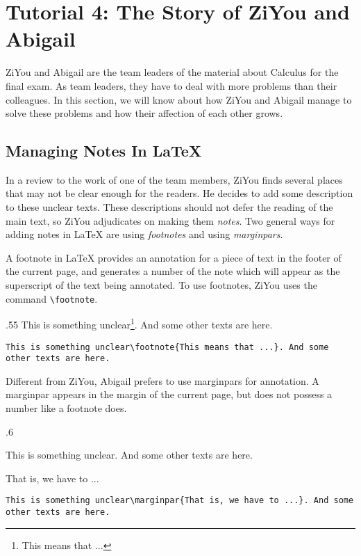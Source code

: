 \section{Tutorial 4: The Story of ZiYou and Abigail} %
ZiYou and Abigail are the team leaders of the material about Calculus for the final exam. As team leaders, they have to deal with more problems than their colleagues. In this section, we will know about how ZiYou and Abigail manage to solve these problems and how their affection of each other grows.

\subsection{Managing Notes In \LaTeX}
In a review to the work of one of the team members, ZiYou finds several places that may not be clear enough for the readers. He decides to add some description to these unclear texts. These descriptions should not defer the reading of the main text, so ZiYou adjudicates on making them \emph{notes}. Two general ways for adding notes in \LaTeX{} are using \emph{footnotes} and using \emph{marginpars}.

A footnote in \LaTeX{} provides an annotation for a piece of text in the footer of the current page, and generates a number of the note which will appear as the superscript of the text being annotated. To use footnotes, ZiYou uses the command \verb=\footnote=.
\begin{miniexammar}{.55\textandmarginlen}{
This is something unclear\footnote{This means that ...}. And some other texts are here.
}
\begin{lstlisting}
This is something unclear\footnote{This means that ...}. And some other texts are here.
\end{lstlisting}
\end{miniexammar}

Different from ZiYou, Abigail prefers to use marginpars for annotation. A marginpar appears in the margin of the current page, but does not possess a number like a footnote does.
\begin{miniexammar}{.6\textandmarginlen}{
\parbox{.68\textwidth}{This is something unclear. And some other texts are here.} \hspace{.03\textwidth}
\parbox{.27\textwidth}{That is, we have to ...}
}
\begin{lstlisting}
This is something unclear\marginpar{That is, we have to ...}. And some other texts are here.
\end{lstlisting}
\end{miniexammar}


